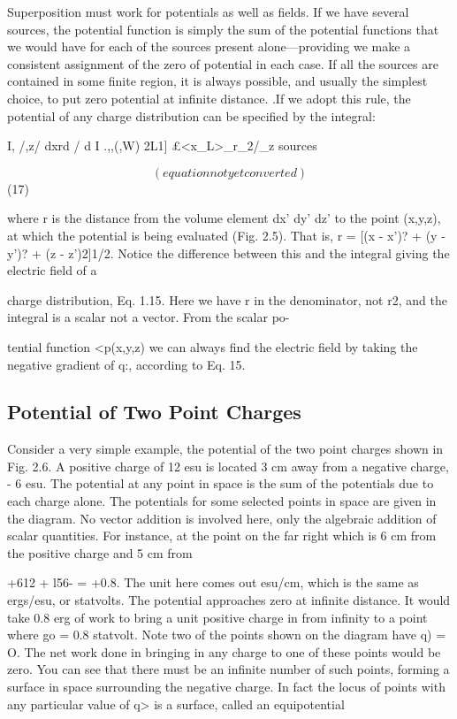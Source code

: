 Superposition must work for potentials as well as fields. If we
have several sources, the potential function is simply the sum of the
potential functions that we would have for each of the sources present
alone---providing we make a consistent assignment of the zero of
potential in each case. If all the sources are contained in some finite
region, it is always possible, and usually the simplest choice, to put
zero potential at infinite distance. .If we adopt this rule, the potential
of any charge distribution can be specified by the integral:

I, /,z/ dxrd / d I
.,,(,W) 2L1] £<x_L>_r_2/_z
sources

\begin{equation}
(equation not yet converted)
\end{equation}
(17)

where r is the distance from the volume element dx' dy' dz' to the
point (x,y,z), at which the potential is being evaluated (Fig. 2.5).
That is, r = [(x - x')? + (y - y')? + (z - z')2]1/2. Notice the
difference between this and the integral giving the electric field of a

charge distribution, Eq. 1.15. Here we have r in the denominator,
not r2, and the integral is a scalar not a vector. From the scalar po-

tential function <p(x,y,z) we can always find the electric field by taking
the negative gradient of q:, according to Eq. 15.

\subsection{Potential of Two Point Charges}

 Consider a very simple example,
the potential of the two point charges shown in Fig. 2.6. A positive
charge of 12 esu is located 3 cm away from a negative charge, - 6 esu.
The potential at any point in space is the sum of the potentials due to
each charge alone. The potentials for some selected points in space
are given in the diagram. No vector addition is involved here, only
the algebraic addition of scalar quantities. For instance, at the point
on the far right which is 6 cm from the positive charge and 5 cm from

+612 + l56- = +0.8.
The unit here comes out esu/cm, which is the same as ergs/esu, or
statvolts. The potential approaches zero at infinite distance. It
would take 0.8 erg of work to bring a unit positive charge in from
infinity to a point where go = 0.8 statvolt. Note two of the points
shown on the diagram have q) = O. The net work done in bringing
in any charge to one of these points would be zero. You can see that
there must be an infinite number of such points, forming a surface in
space surrounding the negative charge. In fact the locus of points
with any particular value of q> is a surface, called an equipotential

